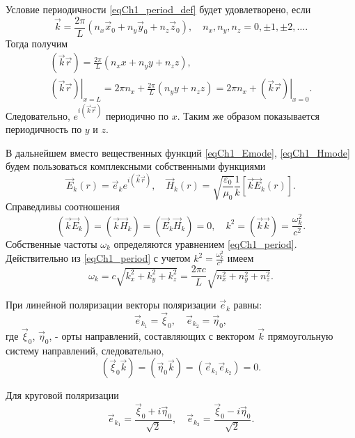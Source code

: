 Условие периодичности \eqref{eqCh1_period_def} будет удовлетворено,
если 
\begin{equation}
\vec{k} = \frac{2 \pi}{L}\left(n_x \vec{x}_0
+ n_y \vec{y}_0
+ n_z \vec{z}_0
\right),
\quad
n_x, n_y, n_z = 0, \pm 1, \pm 2, \dots .
\label{eqCh1_period}
\end{equation}
Тогда получим
\begin{eqnarray}
\left(\vec{k}\vec{r}\right) = \frac{2 \pi}{L}\left(n_x x
+ n_y y
+ n_z z
\right),
\nonumber \\
\left.\left(\vec{k}\vec{r}\right)\right|_{x = L} = 2 \pi n_x + \frac{2 \pi}{L}\left(n_y y
+ n_z z
\right) = 
2 \pi n_x + \left.\left(\vec{k}\vec{r}\right)\right|_{x = 0}.
\end{eqnarray}
Следовательно,    
$e^{i\left(\vec{k}\vec{r}\right)}$
периодично по $x$.  Таким же образом показывается
периодичность по  $y$  и  $z$.
 
В дальнейшем вместо вещественных функций \eqref{eqCh1_Emode}, 
\eqref{eqCh1_Hmode} будем пользоваться
комплексными собственными функциями 
\begin{equation}
\vec{E}_k\left(r\right) = \vec{e}_k e^{i \left( \vec{k}\vec{r}\right)},
\quad
\vec{H}_k\left(r\right) = \sqrt{\frac{\varepsilon_0}{\mu_0}}\frac{1}{k}
\left[\vec{k}\vec{E}_k\left(r\right)\right].
\label{eqCh1_EHmode}
\end{equation}
Справедливы соотношения
\[
\left(\vec{k}\vec{E}_k\right) = 
\left(\vec{k}\vec{H}_k\right) = 
\left(\vec{E}_k\vec{H}_k\right) = 0,
\quad
k^2 = \left(\vec{k}\vec{k}\right) = 
\frac{\omega_k^2}{c^2}.
\]
Собственные частоты $\omega_k$ определяются уравнением
\eqref{eqCh1_period}. Действительно из \eqref{eqCh1_period} с учетом
$k^2 = \frac{\omega_k^2}{c^2}$ имеем 
\begin{equation}
\omega_k = c \sqrt{k_x^2 + k_y^2 + k_z^2} = 
\frac{2 \pi c}{L} \sqrt{n_x^2 + n_y^2 + n_z^2}.
\end{equation}

При линейной поляризации векторы поляризации $\vec{e}_k$ равны:
\[
\vec{e}_{k_1} = \vec{\xi}_0,
\quad
\vec{e}_{k_2} = \vec{\eta}_0,
\]
где $\vec{\xi}_0$, $\vec{\eta}_0$, - орты направлений, составляющих с
вектором $\vec{k}$ прямоугольную систему направлений, следовательно, 
\[
\left(\vec{\xi}_0\vec{k}\right) =
\left(\vec{\eta}_0\vec{k}\right) =
\left(\vec{e}_{k_1}\vec{e}_{k_2}\right) = 0.
\]

Для круговой поляризации
\[
\vec{e}_{k_1} = \frac{\vec{\xi}_0 + i \vec{\eta}_0}{\sqrt{2}},
\quad
\vec{e}_{k_2} = \frac{\vec{\xi}_0 - i \vec{\eta}_0}{\sqrt{2}}.
\]

